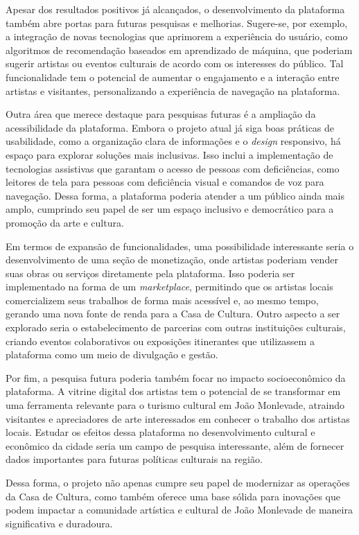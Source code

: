Apesar dos resultados positivos já alcançados, o desenvolvimento da plataforma também abre portas para futuras pesquisas e melhorias. Sugere-se, por exemplo, a integração de novas tecnologias que aprimorem a experiência do usuário, como algoritmos de recomendação baseados em aprendizado de máquina, que poderiam sugerir artistas ou eventos culturais de acordo com os interesses do público. Tal funcionalidade tem o potencial de aumentar o engajamento e a interação entre artistas e visitantes, personalizando a experiência de navegação na plataforma.

Outra área que merece destaque para pesquisas futuras é a ampliação da acessibilidade da plataforma. Embora o projeto atual já siga boas práticas de usabilidade, como a organização clara de informações e o \textit{design} responsivo, há espaço para explorar soluções mais inclusivas. Isso inclui a implementação de tecnologias assistivas que garantam o acesso de pessoas com deficiências, como leitores de tela para pessoas com deficiência visual e comandos de voz para navegação. Dessa forma, a plataforma poderia atender a um público ainda mais amplo, cumprindo seu papel de ser um espaço inclusivo e democrático para a promoção da arte e cultura.

Em termos de expansão de funcionalidades, uma possibilidade interessante seria o desenvolvimento de uma seção de monetização, onde artistas poderiam vender suas obras ou serviços diretamente pela plataforma. Isso poderia ser implementado na forma de um \textit{marketplace}, permitindo que os artistas locais comercializem seus trabalhos de forma mais acessível e, ao mesmo tempo, gerando uma nova fonte de renda para a Casa de Cultura. Outro aspecto a ser explorado seria o estabelecimento de parcerias com outras instituições culturais, criando eventos colaborativos ou exposições itinerantes que utilizassem a plataforma como um meio de divulgação e gestão.

Por fim, a pesquisa futura poderia também focar no impacto socioeconômico da plataforma. A vitrine digital dos artistas tem o potencial de se transformar em uma ferramenta relevante para o turismo cultural em João Monlevade, atraindo visitantes e apreciadores de arte interessados em conhecer o trabalho dos artistas locais. Estudar os efeitos dessa plataforma no desenvolvimento cultural e econômico da cidade seria um campo de pesquisa interessante, além de fornecer dados importantes para futuras políticas culturais na região.

Dessa forma, o projeto não apenas cumpre seu papel de modernizar as operações da Casa de Cultura, como também oferece uma base sólida para inovações que podem impactar a comunidade artística e cultural de João Monlevade de maneira significativa e duradoura.
